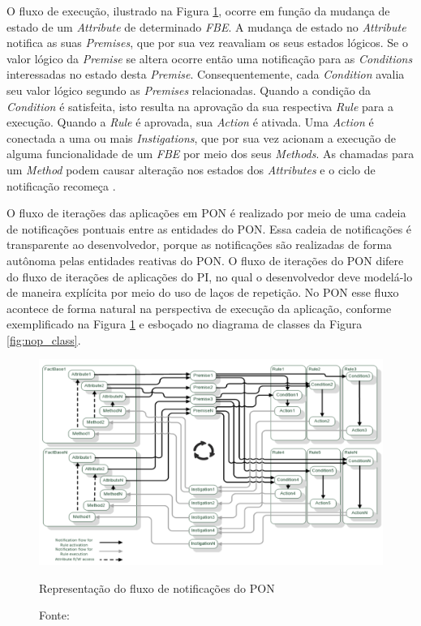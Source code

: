O fluxo de execução, ilustrado na Figura \ref{fig:nop_chain}, ocorre em função
da mudança de estado de um \textit{Attribute} de determinado \textit{FBE}. A
mudança de estado no \textit{Attribute} notifica as suas \textit{Premises}, que
por sua vez reavaliam os seus estados lógicos. Se o valor lógico da
\textit{Premise} se altera ocorre então uma notificação para as
\textit{Conditions} interessadas no estado desta \textit{Premise}.
Consequentemente, cada \textit{Condition} avalia seu valor lógico segundo as
\textit{Premises} relacionadas. Quando a condição da \textit{Condition} é
satisfeita, isto resulta na aprovação da sua respectiva \textit{Rule} para a
execução. Quando a \textit{Rule} é aprovada, sua \textit{Action} é ativada. Uma
\textit{Action} é conectada a uma ou mais \textit{Instigations}, que por sua vez
acionam a execução de alguma funcionalidade de um \textit{FBE} por meio dos seus
\textit{Methods}. As chamadas para um \textit{Method} podem causar alteração nos
estados dos \textit{Attributes} e o ciclo de notificação recomeça
\cite{msc_Banaszewski_2009}.

O fluxo de iterações das aplicações em PON é realizado por meio de uma cadeia de
notificações pontuais entre as entidades do PON. Essa cadeia de notificações é
transparente ao desenvolvedor, porque as notificações são realizadas de forma
autônoma pelas entidades reativas do PON. O fluxo de iterações do PON difere do
fluxo de iterações de aplicações do PI, no qual o desenvolvedor deve modelá-lo
de maneira explícita por meio do uso de laços de repetição. No PON esse fluxo
acontece de forma natural na perspectiva de execução da aplicação, conforme
exemplificado na Figura \ref{fig:nop_chain} e esboçado no diagrama de classes da
Figura \ref{fig:nop_class}.

\begin{figure}[!htb]
  \centering
  \includegraphics[width=\textwidth]{../figures/notificacoes_linhares.png}
  \smallskip
  \caption{Representação do fluxo de notificações do PON}
  \caption*{Fonte: }
  \label{fig:nop_chain}
\end{figure}

